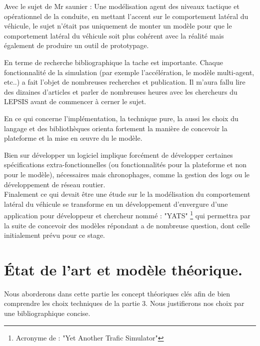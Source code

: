 \documentclass[a4paper,11pt]{article}
\begin{document}
Avec le sujet de Mr saunier : Une modélisation agent des niveaux tactique et opérationnel de la conduite, en mettant l'accent sur le comportement latéral du véhicule, le sujet n'était pas uniquement de monter un modèle pour que le comportement latéral du véhicule soit plus cohérent avec la réalité mais également de produire un outil de prototypage.
\newline

En terme de recherche bibliographique la tache est importante. Chaque fonctionnalité de la simulation (par exemple l'accélération, le modèle multi-agent, etc..) a fait l'objet de nombreuses recherches et publication. Il m'aura fallu lire des dizaines d'articles et parler de nombreuses heures avec les chercheurs du LEPSIS avant de commencer à cerner le sujet. 

En ce qui concerne l'implémentation, la technique pure, la aussi les choix du langage et des bibliothèques orienta fortement la manière de concevoir la plateforme et la mise en œuvre du le modèle.

Bien sur développer un logiciel implique forcément de développer certaines spécifications extra-fonctionnelles (ou fonctionnalités pour la plateforme et non pour le modèle), nécessaires mais chronophages, comme la gestion des logs ou le développement de réseau routier.\\

Finalement ce qui devait être une étude sur le la modélisation du comportement latéral du véhicule se transforme en un développement d'envergure d'une application pour développeur et chercheur nommé : "YATS" \footnote{ Acronyme de : "Yet Another Trafic Simulator"} qui permettra par la suite de concevoir des modèles répondant a de nombreuse question, dont celle initialement prévu pour ce stage. 

\newpage


\section{État de l'art et modèle théorique.}

Nous aborderons dans cette partie les concept théoriques clés afin de bien comprendre les choix techniques de la partie 3. Nous justifierons nos choix par une bibliographique concise. 
\end{document}
